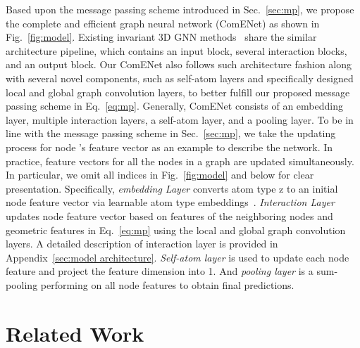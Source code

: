 \documentclass{article}
\begin{document}
Based upon the message passing scheme introduced in Sec.~\ref{sec:mp}, 
we propose the complete and efficient graph neural network (ComENet) as shown in Fig.~\ref{fig:model}. 
\textcolor{COLOR}{Existing invariant 3D GNN methods~\cite{schmidhuber2015deep,klicpera_dimenet_2020,klicpera_dimenetpp_2020,liu2022spherical,klicpera2021gemnet,schutt2021equivariant}
share the similar architecture pipeline, which contains an input block, several interaction blocks, and an output block.
Our ComENet also follows such architecture fashion along with several novel components, such as self-atom layers and specifically designed local and global graph convolution layers, to better fulfill our proposed message passing scheme in Eq.~\ref{eq:mp}.}
Generally, ComENet consists of an embedding layer, multiple interaction layers, a self-atom layer, and a pooling layer. To be in line with the message passing scheme in Sec.~\ref{sec:mp},
we take the updating process for node 's feature vector 
as an example to describe the network. \textcolor{COLOR}{In practice, feature vectors for all the nodes in a graph are updated simultaneously.}
In particular, we omit all indices in Fig.~\ref{fig:model} and below for clear presentation.
Specifically, \textit{embedding Layer} converts atom type z to an initial node feature vector \textcolor{COLOR}{} via learnable atom type embeddings~\cite{schutt2017schnet,klicpera_dimenet_2020}.
\textit{Interaction Layer} updates node feature vector  based on features of the neighboring nodes and geometric features  in Eq.~\ref{eq:mp} using the local and global graph convolution layers. A detailed description of interaction layer is provided in Appendix~\ref{sec:model architecture}.
\textit{Self-atom layer} is used to update each node feature and project the feature dimension into 1. 
And \textit{pooling layer} is a sum-pooling performing on all node features to obtain final predictions.


\section{Related Work}
\end{document}
